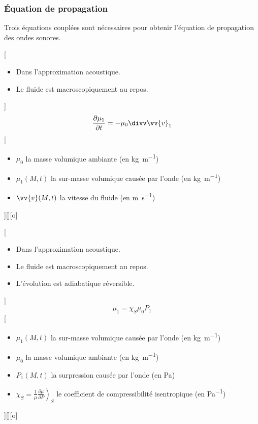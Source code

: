 \subsubsection{Équation de propagation}
Trois équations couplées sont nécessaires pour obtenir l'équation de propagation des ondes sonores.

[
    \begin{itemize}
        \item Dans l'approximation acoustique.
        \item Le fluide est macroscopiquement au repos.
    \end{itemize}
]
{
    $$\frac{\partial \mu_1}{\partial t}=-\mu_0\divv\vv{v}_1$$
}
[
    \begin{itemize}
        \item $\mu_0$ la masse volumique ambiante (en \unit{kg.m^{-1}})
        \item $\mu_1(M,t)$ la sur-masse volumique causée par l'onde (en \unit{kg.m^{-1}})
        \item $\vv{v}(M,t)$ la vitesse du fluide (en \unit{m.s^{-1}})
    \end{itemize}
][][o]

[
    \begin{itemize}
        \item Dans l'approximation acoustique.
        \item Le fluide est macroscopiquement au repos.
        \item L'évolution est adiabatique réversible.
    \end{itemize}
]
{
    $$\mu_1=\chi_S\mu_0P_1$$
}
[
    \begin{itemize}
        \item $\mu_1(M,t)$ la sur-masse volumique causée par l'onde (en \unit{kg.m^{-1}})
        \item $\mu_0$ la masse volumique ambiante (en \unit{kg.m^{-1}})
        \item $P_1(M,t)$ la surpression causée par l'onde (en \unit{Pa})
        \item $\chi_S=\frac{1}{\mu}\left.\frac{\partial \mu}{\partial P}\right)_S$ le coefficient de compressibilité isentropique (en \unit{Pa^{-1}})
    \end{itemize}
][][o]

